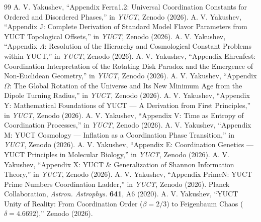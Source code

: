 \documentclass[12pt,a4paper]{article}
\begin{document}
	\begin{thebibliography}{99}
		 A. V. Yakushev, ``Appendix Ferra1.2: Universal Coordination Constants for Ordered and Disordered Phases,'' in \emph{YUCT}, Zenodo (2026).
		 A. V. Yakushev, ``Appendix J: Complete Derivation of Standard Model Flavor Parameters from YUCT Topological Offsets,'' in \emph{YUCT}, Zenodo (2026).
		 A. V. Yakushev, ``Appendix \(\Lambda\): Resolution of the Hierarchy and Cosmological Constant Problems within YUCT,'' in \emph{YUCT}, Zenodo (2026).
		 A. V. Yakushev, ``Appendix Ehrenfest: Coordination Interpretation of the Rotating Disk Paradox and the Emergence of Non-Euclidean Geometry,'' in \emph{YUCT}, Zenodo (2026).
		 A. V. Yakushev, ``Appendix \(\Omega\): The Global Rotation of the Universe and Its New Minimum Age from the Dipole Turning Radius,'' in \emph{YUCT}, Zenodo (2026).
		 A. V. Yakushev, ``Appendix Y: Mathematical Foundations of YUCT — A Derivation from First Principles,'' in \emph{YUCT}, Zenodo (2026).
		 A. V. Yakushev, ``Appendix V: Time as Entropy of Coordination Processes,'' in \emph{YUCT}, Zenodo (2026).
		 A. V. Yakushev, ``Appendix M: YUCT Cosmology — Inflation as a Coordination Phase Transition,'' in \emph{YUCT}, Zenodo (2026).
		 A. V. Yakushev, ``Appendix E: Coordination Genetics — YUCT Principles in Molecular Biology,'' in \emph{YUCT}, Zenodo (2026).
		 A. V. Yakushev, ``Appendix X: YUCT \& Generalization of Shannon Information Theory,'' in \emph{YUCT}, Zenodo (2026).
		 A. V. Yakushev, ``Appendix PrimeN: YUCT Prime Numbers Coordination Ladder,'' in \emph{YUCT}, Zenodo (2026).
		 Planck Collaboration, \emph{Astron. Astrophys.} \textbf{641}, A6 (2020).
		 A. V. Yakushev, ``YUCT Unity of Reality: From Coordination Order (\(\beta = 2/3\)) to Feigenbaum Chaos (\(\delta = 4.6692\)),'' Zenodo (2026).
	\end{thebibliography}
	
\end{document}
